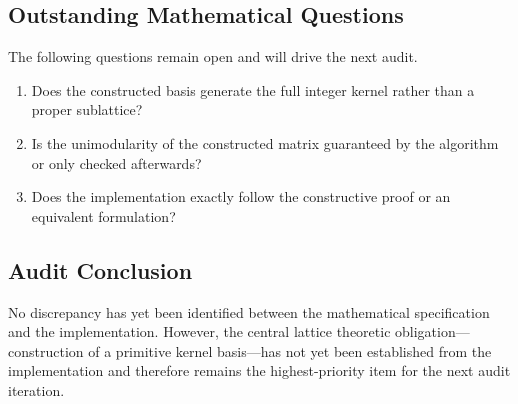 \subsection{Outstanding Mathematical Questions}

The following questions remain open and will drive the next audit.

\begin{enumerate}
\item Does the constructed basis generate the full integer kernel rather
than a proper sublattice?
\item Is the unimodularity of the constructed matrix guaranteed by the
algorithm or only checked afterwards?
\item Does the implementation exactly follow the constructive proof or an
equivalent formulation?
\end{enumerate}

\subsection{Audit Conclusion}

No discrepancy has yet been identified between the mathematical
specification and the implementation. However, the central lattice
theoretic obligation---construction of a primitive kernel basis---has not
yet been established from the implementation and therefore remains the
highest-priority item for the next audit iteration.
